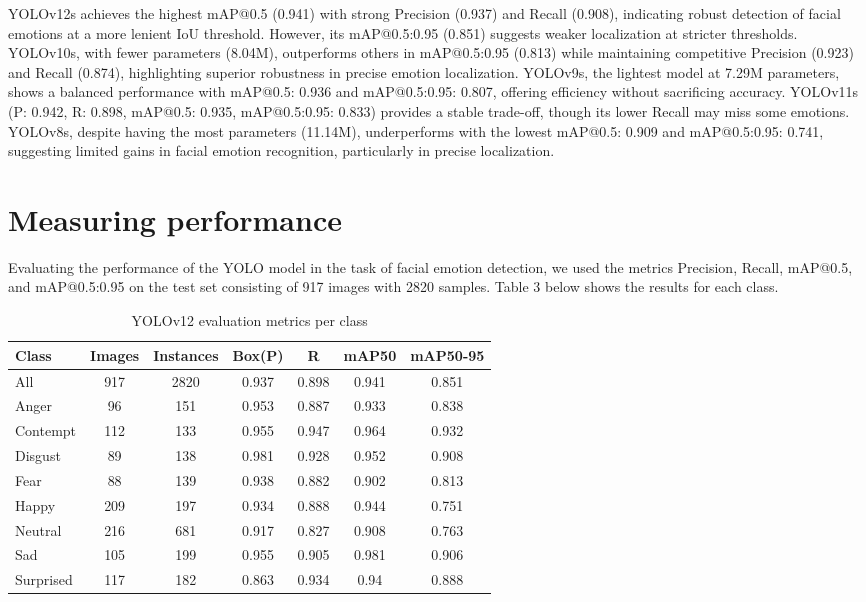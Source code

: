 \documentclass[a4paper,13pt]{report}
\begin{document}
YOLOv12s achieves the highest mAP@0.5 (0.941) with strong Precision (0.937) and Recall (0.908), indicating robust detection of facial emotions at a more lenient IoU threshold. However, its mAP@0.5:0.95 (0.851) suggests weaker localization at stricter thresholds. YOLOv10s, with fewer parameters (8.04M), outperforms others in mAP@0.5:0.95 (0.813) while maintaining competitive Precision (0.923) and Recall (0.874), highlighting superior robustness in precise emotion localization. YOLOv9s, the lightest model at 7.29M parameters, shows a balanced performance with mAP@0.5: 0.936 and mAP@0.5:0.95: 0.807, offering efficiency without sacrificing accuracy. YOLOv11s (P: 0.942, R: 0.898, mAP@0.5: 0.935, mAP@0.5:0.95: 0.833) provides a stable trade-off, though its lower Recall may miss some emotions. YOLOv8s, despite having the most parameters (11.14M), underperforms with the lowest mAP@0.5: 0.909 and mAP@0.5:0.95: 0.741, suggesting limited gains in facial emotion recognition, particularly in precise localization.

\section{Measuring performance}
Evaluating the performance of the YOLO model in the task of facial emotion detection, we used the metrics Precision, Recall, mAP@0.5, and mAP@0.5:0.95 on the test set consisting of 917 images with 2820 samples. Table 3 below shows the results for each class.

\begin{table}[H]
    \centering
    \caption{YOLOv12 evaluation metrics per class}
    \label{tab:yolov12_metrics}
    \begin{tabular}{lcccccc}
        \toprule
        \textbf{Class} & \textbf{Images} & \textbf{Instances} & \textbf{Box(P)} & \textbf{R} & \textbf{mAP50} & \textbf{mAP50-95} \\
        \midrule
        All       & 917  & 2820 & 0.937 & 0.898 & 0.941 & 0.851 \\
        Anger     & 96   & 151  & 0.953 & 0.887 & 0.933 & 0.838 \\
        Contempt  & 112  & 133  & 0.955 & 0.947 & 0.964 & 0.932 \\
        Disgust   & 89   & 138  & 0.981 & 0.928 & 0.952 & 0.908 \\
        Fear      & 88   & 139  & 0.938 & 0.882 & 0.902 & 0.813 \\
        Happy     & 209  & 197  & 0.934 & 0.888 & 0.944 & 0.751 \\
        Neutral   & 216  & 681  & 0.917 & 0.827 & 0.908 & 0.763 \\
        Sad       & 105  & 199  & 0.955 & 0.905 & 0.981 & 0.906 \\
        Surprised & 117  & 182  & 0.863 & 0.934 & 0.94  & 0.888 \\
        \bottomrule
    \end{tabular}
\end{table}
\end{document}
